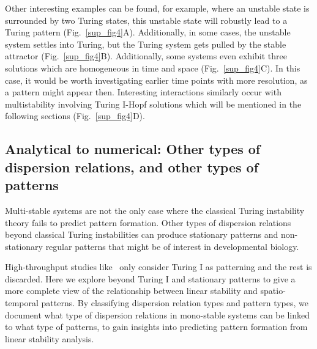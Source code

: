 Other interesting examples can be found, for example, where an unstable state is surrounded by two Turing states, this unstable state will robustly lead to a Turing pattern (Fig.~\ref{sup_fig4}A).
Additionally, in some cases, the unstable system settles into Turing, but the Turing system gets pulled by the stable attractor (Fig.~\ref{sup_fig4}B). Additionally, some systems even exhibit three solutions which are homogeneous in time and space (Fig.~\ref{sup_fig4}C).
In this case, it would be worth investigating earlier time points with more resolution, as a pattern might appear then.
Interesting interactions similarly occur with multistability involving Turing I-Hopf solutions which will be mentioned in the following sections (Fig.~\ref{sup_fig4}D).



\subsection{Analytical to numerical: Other types of dispersion relations, and other types of patterns} \label{nogrowth}
Multi-stable systems are not the only case where the classical Turing instability theory fails to predict pattern formation.
Other types of dispersion relations beyond classical Turing instabilities can produce stationary patterns and non-stationary regular patterns that might be of interest in developmental biology.

High-throughput studies like~\cite{Scholes2019, Zheng2016, Marcon} only consider Turing I as patterning and the rest is discarded.
Here we explore beyond Turing I and stationary patterns to give a more complete view of the relationship between linear stability and spatio-temporal patterns.
By classifying dispersion relation types and pattern types, we document what type of dispersion relations in mono-stable systems can be linked to what type of patterns, to gain insights into predicting pattern formation from linear stability analysis.

